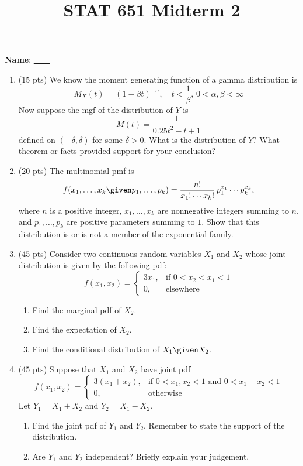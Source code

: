 \documentclass[12pt]{article}
\begin{document}
\title{STAT 651 Midterm 2}
\author{}
\maketitle

\textbf{Name}: \underline{\ \ \hskip8cm\ \ }
\medskip

\begin{enumerate}

\item (15 pts)
We know the moment generating function of a gamma distribution is
\[
M_X(t) = (1 - \beta t)^{-\alpha},
\quad
t<\frac{1}{\beta},\, 0 < \alpha,\beta < \infty
\]
Now suppose the mgf of the distribution of $Y$ is
\[
M(t) = \frac{1}{0.25t^2 - t + 1}
\]
defined on $(-\delta, \delta)$ for some $\delta > 0$.
What is the distribution of $Y$?
What theorem or facts provided support for your conclusion?

\item (20 pts)
The multinomial pmf is
\[
f(x_1,\dotsc,x_k \given p_1,\dotsc,p_k)
= \frac{n!}{x_1!\dotsm x_k!}\, p_1^{x_1}\dotsm p_k^{x_k}
,
\]
where $n$ is a positive integer,
$x_1,\dotsc,x_k$ are nonnegative integers summing to $n$,
and
$p_1,\dotsc,p_k$ are positive parameters summing to $1$.
Show that this distribution is or is not a member of the exponential
family.

\item (45 pts)
Consider two continuous random variables $X_1$ and $X_2$ whose joint
distribution is given by the following pdf:
\[
f(x_1, x_2) = \begin{cases}
    3x_1, & \text{if $0 < x_2 < x_1 < 1$}
    \\
    0, & \text{elsewhere}
\end{cases}
\]
\begin{enumerate}
\item Find the marginal pdf of $X_2$.
\item Find the expectation of $X_2$.
\item Find the conditional distribution of $X_1 \given X_2$.
\end{enumerate}

\item (45 pts)
Suppose that $X_1$ and $X_2$ have joint pdf
\[
f(x_1, x_2) =
\begin{cases}
    3(x_1 + x_2),
        & \text{if $0 < x_1, x_2 < 1$ and $0 < x_1 + x_2 < 1$}
    \\
    0, & \text{otherwise}
\end{cases}
\]
Let $Y_1 = X_1 + X_2$ and $Y_2 = X_1 - X_2$.
\begin{enumerate}
\item
Find the joint pdf of $Y_1$ and $Y_2$.
Remember to state the support of the distribution.
\item
Are $Y_1$ and $Y_2$ independent? Briefly explain your judgement.
\end{enumerate}

\end{enumerate}
\end{document}

